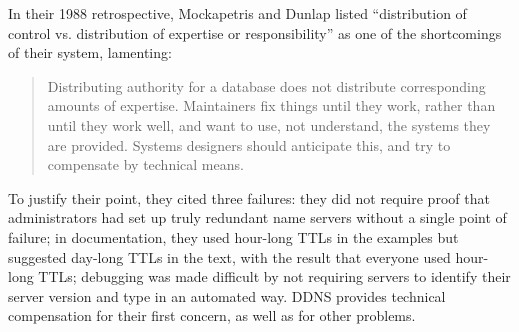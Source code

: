 In their 1988 retrospective, Mockapetris and Dunlap
listed ``distribution of control vs. distribution of expertise
or responsibility'' as one of the shortcomings of their system,
lamenting:
\begin{quote}
Distributing authority for a database does not distribute
corresponding amounts of expertise.  Maintainers fix things
until they work, rather than until they work well, and want to use,
not understand, the systems they are provided.
Systems designers should anticipate this, and try to
compensate by technical means.
\end{quote}
To justify their point, they cited three failures:
they did not require proof that administrators had set up
truly redundant name servers without a single point of failure;
in documentation, they used hour-long TTLs in the examples but suggested
day-long TTLs in the text, with the result that everyone used
hour-long TTLs; debugging was made difficult by not requiring
servers to identify their server version and type in an automated way.
DDNS provides technical compensation for their first concern,
as well as for other problems.

